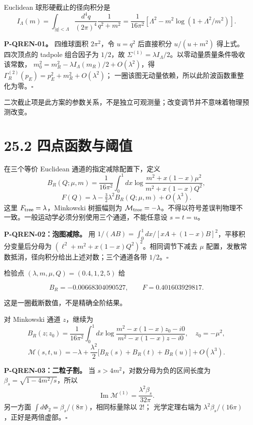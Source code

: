 \documentclass[
  11pt,
  oneside]{book}
\begin{document}
Euclidean 球形硬截止的径向积分是 \[
I_\Lambda(m)=\int_{|q|<\Lambda}\frac{d^4q}{(2\pi)^4}
\frac1{q^2+m^2}
=\frac1{16\pi^2}\left[\Lambda^2-m^2\log(1+\Lambda^2/m^2)\right].
\] \protect\hypertarget{p-qren-01}{}{}

\textbf{P-QREN-01。} 四维球面积 \(2\pi^2\)，令 \(u=q^2\) 后直接积分
\(u/(u+m^2)\) 得上式。四次顶点的 tadpole 组合因子为 \(1/2\)，故
\(\Sigma^{(1)}=\lambda I_\Lambda/2\)。以零动量质量条件吸收该常数，
\(m_0^2=m_R^2-\lambda I_\Lambda(m_R)/2+O(\lambda^2)\)，得
\(\Gamma_R^{(2)}(p_E)=p_E^2+m_R^2+O(\lambda^2)\)；
一圈该图无动量依赖，所以此阶波函数重整化为零。\(\square\)

二次截止项是此方案的参数关系，不是独立可观测量；改变调节并不意味着物理预测改变。

\section{25.2 四点函数与阈值}

在三个等价 Euclidean 通道的指定减除配置下，定义 \[
B_R(Q;\mu,m)=\frac1{16\pi^2}\int_0^1dx
\log\frac{m^2+x(1-x)\mu^2}{m^2+x(1-x)Q^2},
\] \[
F(Q)=\lambda-\tfrac32\lambda^2 B_R(Q;\mu,m)+O(\lambda^3).
\] 这里 \(F_{\rm tree}=\lambda\)，Minkowski 树振幅则为
\(\mathcal M_{\rm tree}=-\lambda\)。不得以符号差误判物理不一致。一般运动学必须分别使用三个通道，不能任意设
\(s=t=u\)。

\protect\hypertarget{p-qren-02}{}{}

\textbf{P-QREN-02：泡图减除。} 用
\(1/(AB)=\int_0^1dx/[xA+(1-x)B]^2\)，平移积分变量后分母为
\((\ell^2+m^2+x(1-x)Q^2)^2\)。相同调节下减去 \(\mu\)
配置，发散常数抵消，径向积分给出上述对数；三个通道各带
\(1/2\)。\(\square\)

检验点 \((\lambda,m,\mu,Q)=(0.4,1,2,5)\) 给

\[
B_R=-0.00668304090527,\qquad F=0.401603929817.
\]

这是一圈截断数值，不是精确全阶结果。

对 Minkowski 通道 \(z\)，继续为 \[
B_R(z;z_0)=\frac1{16\pi^2}\int_0^1dx
\log\frac{m^2-x(1-x)z_0-i0}{m^2-x(1-x)z-i0},
\quad z_0=-\mu^2,
\] \[
\mathcal M(s,t,u)=-\lambda+
\frac{\lambda^2}{2}\bigl[B_R(s)+B_R(t)+B_R(u)\bigr]+O(\lambda^3).
\] \protect\hypertarget{p-qren-03}{}{}

\textbf{P-QREN-03：二粒子割。} 当 \(s>4m^2\)，对数分母为负的区间长度为
\(\beta_s=\sqrt{1-4m^2/s}\)，所以 \[
\operatorname{Im}\mathcal M^{(1)}=\frac{\lambda^2\beta_s}{32\pi}.
\] 另一方面 \(\int d\Phi_2=\beta_s/(8\pi)\)，相同标量除以 \(2!\)；
光学定理右端为 \(\lambda^2\beta_s/(16\pi)\)，正好是两倍虚部。\(\square\)
\end{document}

